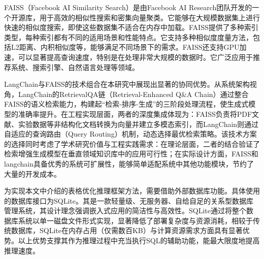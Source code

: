 FAISS\cite{johnson2019billion}（Facebook AI Similarity Search）是由Facebook AI Research团队开发的一个开源库，用于高效的相似性搜索和密集向量聚类。它能够在大规模数据集上进行快速的相似度搜索，即使这些数据集不适合在内存中加载。FAISS提供了多种索引类型，每种索引都有不同的适用场景和性能特点。它支持多种相似度度量方法，包括L2距离、内积相似度等，能够满足不同场景下的需求。FAISS还支持GPU加速，可以显著提高查询速度，特别是在处理非常大规模的数据时。它广泛应用于推荐系统、搜索引擎、自然语言处理等领域。

LangChain与FAISS的技术组合在本研究中展现出显著的协同优势。从系统架构视角，LangChain的RetrievalQA链（Retrieval-Enhanced Q\&A Chain）通过整合FAISS的语义检索能力，构建起“检索-排序-生成”的三阶段处理流程，使生成式模型的准确率提升。在工程实现层面，两者的深度集成体现为：FAISS负责将PDF文献、实验数据等非结构化文档转换为向量并建立多模态索引，而LangChain则通过自适应的查询路由（Query Routing）机制，动态选择最优检索策略。该技术方案的选择同时考虑了学术研究价值与工程实践需求：在理论层面，二者的结合验证了检索增强生成模型在垂直领域知识库中的应用可行性；在实际设计方面，FAISS和langchain具备优秀的系统可扩展性，能够简单适配系统中其他功能模块，节约了大量的开发成本。

为实现本文中介绍的表格优化推理框架方法，需要借助外部数据库功能。具体使用的数据库接口为SQLite。其是一款轻量级、无服务器、自给自足的关系型数据库管理系统，其设计理念强调嵌入式应用的简洁性与高效性。SQLite通过将整个数据库系统以单一磁盘文件形式实现，显著降低了部署复杂度与资源消耗，相较于传统数据库，SQLite在内存占用（仅需数百KB）与计算资源需求方面具有显著优势。以上优势支撑其作为推理过程中充当执行SQL的辅助功能，能最大限度地提高推理速度。

